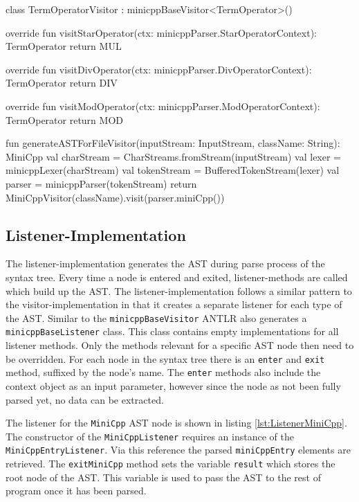 \begin{KotlinCode}[float,numbers=none,caption=Implementation of the \texttt{TermOperatorVisitor} class., label=lst:VisitorTermOpVis]
class TermOperatorVisitor : minicppBaseVisitor<TermOperator>() {
    override fun visitStarOperator(ctx: minicppParser.StarOperatorContext): TermOperator {
        return MUL
    }

    override fun visitDivOperator(ctx: minicppParser.DivOperatorContext): TermOperator {
        return DIV
    }

    override fun visitModOperator(ctx: minicppParser.ModOperatorContext): TermOperator {
        return MOD
    }
}
\end{KotlinCode}

\begin{KotlinCode}[float,numbers=none,caption=Code for the generation of the AST using the visitor-pattern., label=lst:VisitorExec]
fun generateASTForFileVisitor(inputStream: InputStream, className: String): MiniCpp 
{
    val charStream = CharStreams.fromStream(inputStream)
    val lexer = minicppLexer(charStream)
    val tokenStream = BufferedTokenStream(lexer)
    val parser = minicppParser(tokenStream)
    return MiniCppVisitor(className).visit(parser.miniCpp())
}
\end{KotlinCode}

\subsection{Listener-Implementation}

The listener-implementation generates the AST during parse process of the syntax tree. Every time a node is entered and exited, listener-methods are called which build up the AST. The listener-implementation follows a similar pattern to the visitor-implementation in that it creates a separate listener for each type of the AST. Similar to the \verb|minicppBaseVisitor| ANTLR also generates a \verb|minicppBaseListener| class. This class contains empty implementations for all listener methods. Only the methods relevant for a specific AST node then need to be overridden. For each node in the syntax tree there is an \verb|enter| and \verb|exit| method, suffixed by the node's name. The \verb|enter| methods also include the context object as an input parameter, however since the node as not been fully parsed yet, no data can be extracted. 

The listener for the \verb|MiniCpp| AST node is shown in listing \ref{lst:ListenerMiniCpp}. The constructor of the \verb|MiniCppListener| requires an instance of the \verb|MiniCppEntryListener|. Via this reference the parsed \verb|miniCppEntry| elements are retrieved. The \verb|exitMiniCpp| method sets the variable \verb|result| which stores the root node of the AST. This variable is used to pass the AST to the rest of program once it has been parsed.

